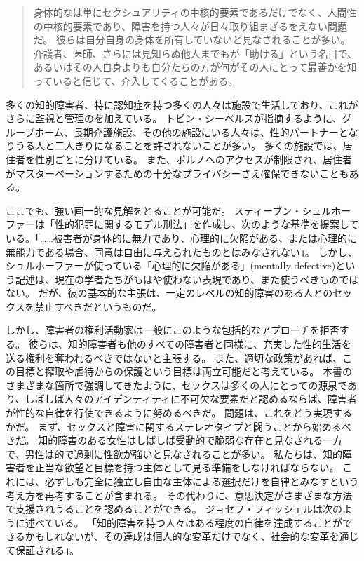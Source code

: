 \documentclass[paper=a4,book,openany]{jlreq}
\begin{document}
\begin{quote}
身体的なは単にセクシュアリティの中核的要素であるだけでなく、人間性の中核的要素であり、障害を持つ人々が日々取り組まざるをえない問題だ。
彼らは自分自身の身体を所有していないと見なされることが多い。
介護者、医師、さらには見知らぬ他人までもが「助ける」という名目で、あるいはその人自身よりも自分たちの方が何がその人にとって最善かを知っていると信じて、介入してくることがある。
\citep[p.218]{scott15:_can_disab_peopl_have_sex}
\end{quote}

多くの知的障害者、特に認知症を持つ多くの人々は施設で生活しており、これがさらに監視と管理のを加えている。
トビン・シーベルスが指摘するように、グループホーム、長期介護施設、その他の施設にいる人々は、性的パートナーとなりうる人と二人きりになることを許されないことが多い。
多くの施設では、居住者を性別ごとに分けている。
また、ポルノへのアクセスが制限され、居住者がマスターベーションするための十分なプライバシーさえ確保できないこともある\citep[p.45]{siebers12:_sexual_cultur_disab_peopl}。

ここでも、強い画一的な見解をとることが可能だ。
スティーブン・シュルホーファーは「性的犯罪に関するモデル刑法」を作成し、次のような基準を提案している。「……被害者が身体的に無力であり、心理的に欠陥がある、または心理的に無能力である場合、同意は自由に与えられたものとはみなされない」\citep[p.283]{schulhofer98:_unwan_sex}。
しかし、シュルホーファーが使っている「心理的に欠陥がある」(mentally defective)という記述は、現在の学者たちがもはや使わない表現であり、また使うべきものではない。
だが、彼の基本的な主張は、一定のレベルの知的障害のある人とのセックスを禁止すべきだというものだ。

しかし、障害者の権利活動家は一般にこのような包括的なアプローチを拒否する。
彼らは、知的障害者も他のすべての障害者と同様に、充実した性的生活を送る権利を奪われるべきではないと主張する。
また、適切な政策があれば、この目標と搾取や虐待からの保護という目標は両立可能だと考えている。
本書のさまざまな箇所で強調してきたように、セックスは多くの人にとっての源泉であり、しばしば人々のアイデンティティに不可欠な要素だと認めるならば、障害者が性的な自律を行使できるように努めるべきだ\citep{vehmas19:_person_profoun_intel_disab_their_right_sex,hollomotz10:_vulner_adult,evans09:_sexual_person_relat_peopl_intel_disab,kittay10:_person_is_philos_is_polit}。
問題は、これをどう実現するかだ。
まず、セックスと障害に関するステレオタイプと闘うことから始めるべきだ。
知的障害のある女性はしばしば受動的で脆弱な存在と見なされる一方で、男性は的で過剰に性欲が強いと見なされることが多い\citep{feely16:_sexual_surveil_contr_commun_based,gill15:_alread_doing_it,barrett14:_disab_mascul}。
私たちは、知的障害者を正当な欲望と目標を持つ主体として見る準備をしなければならない。
これには、必ずしも完全に独立し自由な主体による選択だけを自律とみなすという考え方を再考することが含まれる。
その代わりに、意思決定がさまざまな方法で支援されうることを認めることができる。
ジョセフ・フィッシェルは次のように述べている。
「知的障害を持つ人々はある程度の自律を達成することができるかもしれないが、その達成は個人的な変革だけでなく、社会的な変革を通じて保証される」\citep[p.146]{fischel18:screwconsent}。
\end{document}

